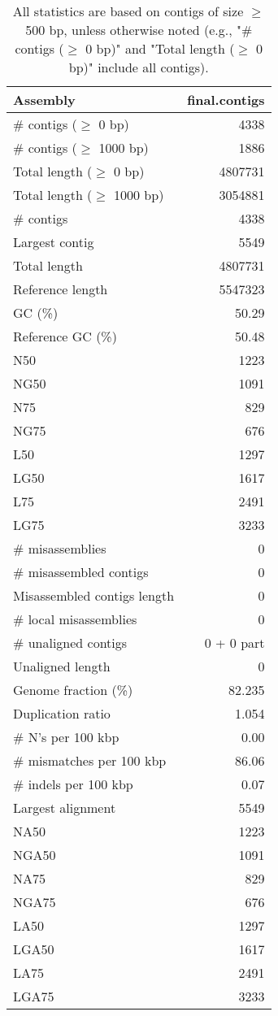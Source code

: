 \documentclass[12pt,a4paper]{article}
\begin{document}
\begin{table}[ht]
\begin{center}
\caption{All statistics are based on contigs of size $\geq$ 500 bp, unless otherwise noted (e.g., "\# contigs ($\geq$ 0 bp)" and "Total length ($\geq$ 0 bp)" include all contigs).}
\begin{tabular}{|l*{1}{|r}|}
\hline
Assembly & final.contigs \\ \hline
\# contigs ($\geq$ 0 bp) & 4338 \\ \hline
\# contigs ($\geq$ 1000 bp) & 1886 \\ \hline
Total length ($\geq$ 0 bp) & 4807731 \\ \hline
Total length ($\geq$ 1000 bp) & 3054881 \\ \hline
\# contigs & 4338 \\ \hline
Largest contig & 5549 \\ \hline
Total length & 4807731 \\ \hline
Reference length & 5547323 \\ \hline
GC (\%) & 50.29 \\ \hline
Reference GC (\%) & 50.48 \\ \hline
N50 & 1223 \\ \hline
NG50 & 1091 \\ \hline
N75 & 829 \\ \hline
NG75 & 676 \\ \hline
L50 & 1297 \\ \hline
LG50 & 1617 \\ \hline
L75 & 2491 \\ \hline
LG75 & 3233 \\ \hline
\# misassemblies & 0 \\ \hline
\# misassembled contigs & 0 \\ \hline
Misassembled contigs length & 0 \\ \hline
\# local misassemblies & 0 \\ \hline
\# unaligned contigs & 0 + 0 part \\ \hline
Unaligned length & 0 \\ \hline
Genome fraction (\%) & 82.235 \\ \hline
Duplication ratio & 1.054 \\ \hline
\# N's per 100 kbp & 0.00 \\ \hline
\# mismatches per 100 kbp & 86.06 \\ \hline
\# indels per 100 kbp & 0.07 \\ \hline
Largest alignment & 5549 \\ \hline
NA50 & 1223 \\ \hline
NGA50 & 1091 \\ \hline
NA75 & 829 \\ \hline
NGA75 & 676 \\ \hline
LA50 & 1297 \\ \hline
LGA50 & 1617 \\ \hline
LA75 & 2491 \\ \hline
LGA75 & 3233 \\ \hline
\end{tabular}
\end{center}
\end{table}
\end{document}
